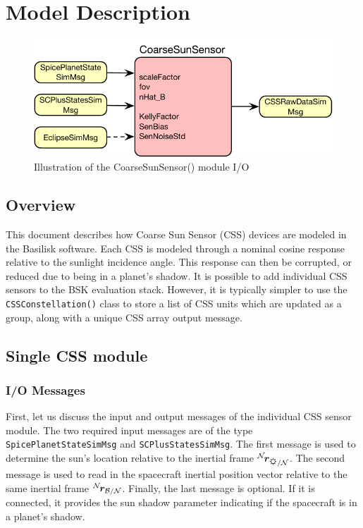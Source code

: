 
\section{Model Description}

\begin{figure}[htb]
	\centerline{
		\includegraphics[]{Figures/moduleDiagram}
	}
	\caption{Illustration of the CoarseSunSensor() module I/O}
	\label{fig:moduleDiagram}
\end{figure}
\subsection{Overview}
This document describes how Coarse Sun Sensor (CSS) devices are modeled in the Basilisk software.  Each CSS is modeled through a nominal cosine response relative to the sunlight incidence angle.  This response can then be corrupted, or reduced due to being in a planet's shadow.  It is possible to add individual CSS sensors to the BSK evaluation stack.  However, it is typically simpler to use the {\tt CSSConstellation()} class to store a list of CSS units which are updated as a group, along with a unique CSS array output message.

\subsection{Single CSS module}
\subsubsection{I/O Messages}
First, let us discuss the input and output messages of the individual CSS sensor module.  The two required input messages are of the type {\tt SpicePlanetStateSimMsg} and {\tt SCPlusStatesSimMsg}.  The first message is used to determine the sun's location relative to the inertial frame $\leftexp{N}{\bm r}_{\sun/\mathcal{N}}$.  The second message is used to read in the spacecraft inertial position vector relative to the same inertial frame $\leftexp{N}{\bm r}_{\cal B/N}$.  Finally, the last message is optional.  If it is connected, it provides the sun shadow parameter indicating if the spacecraft is in a planet's shadow.  

